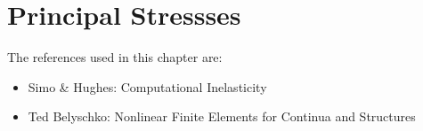 \chapter{Principal Stressses}
\label{chap:principalstresses}

\begin{chapterref}
    The references used in this chapter are:
    \begin{itemize}
        \item Simo \& Hughes: Computational Inelasticity \cite{Simo1998Computational}
        \item Ted Belyschko: Nonlinear Finite Elements for Continua and Structures \cite{Belytschko_Liu_Moran_Elkhodary_2014}
\end{itemize}

\end{chapterref}